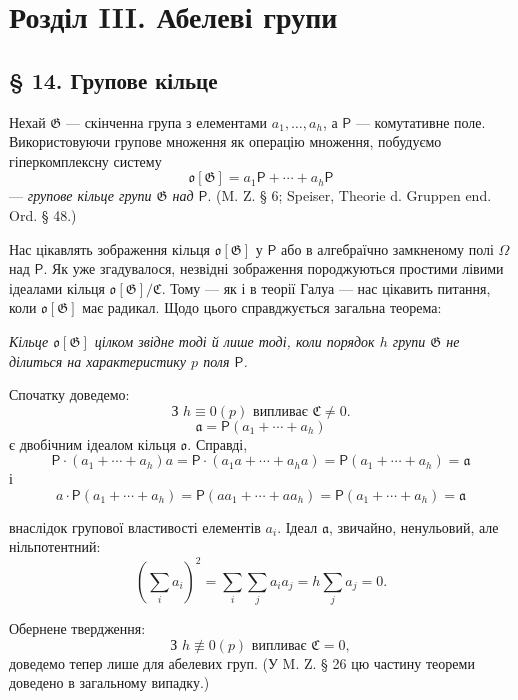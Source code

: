 \documentclass[11pt]{article}
\begin{document}
\section*{Розділ III. Абелеві групи}\label{kapitel-iii.-abelsche-gruppen}

\subsection*{§ 14. Групове кільце}\label{der-gruppenring}

Нехай \(\mathfrak G\) --- скінченна група з елементами \(a_1,\ldots,a_h\), а \(\mathsf P\) --- комутативне поле. Використовуючи групове множення як операцію множення, побудуємо гіперкомплексну систему
\[
\mathfrak o[\mathfrak G]=a_1\mathsf P+\cdots+a_h\mathsf P
\]
--- \emph{групове кільце групи \(\mathfrak G\) над \(\mathsf P\)}. (M. Z. § 6; Speiser, Theorie d. Gruppen end. Ord. § 48.)

Нас цікавлять зображення кільця \(\mathfrak o[\mathfrak G]\) у \(\mathsf P\) або в алгебраїчно замкненому полі \(\Omega\) над \(\mathsf P\). Як уже згадувалося, незвідні зображення породжуються простими лівими ідеалами кільця \(\mathfrak o[\mathfrak G]/\mathfrak C\). Тому --- як і в теорії Галуа --- нас цікавить питання, коли \(\mathfrak o[\mathfrak G]\) має радикал. Щодо цього справджується загальна теорема:

\begin{center}
\emph{Кільце \(\mathfrak o[\mathfrak G]\) цілком звідне тоді й лише тоді, коли порядок \(h\) групи \(\mathfrak G\) не ділиться на характеристику \(p\) поля \(\mathsf P\).}
\end{center}

Спочатку доведемо:
\[
\text{З } h\equiv0(p) \text{ випливає } \mathfrak C\ne 0.
\]
\[
\mathfrak a=\mathsf P(a_1+\cdots+a_h)
\]
є двобічним ідеалом кільця \(\mathfrak o\). Справді,
\[
\mathsf P\cdot(a_1+\cdots+a_h)a
=\mathsf P\cdot(a_1a+\cdots+a_ha)
=\mathsf P(a_1+\cdots+a_h)=\mathfrak a
\]
і
\[
a\cdot\mathsf P(a_1+\cdots+a_h)
=\mathsf P(aa_1+\cdots+aa_h)
=\mathsf P(a_1+\cdots+a_h)=\mathfrak a
\]

внаслідок групової властивості елементів \(a_i\). Ідеал \(\mathfrak a\), звичайно, ненульовий, але нільпотентний:
\[
\left(\sum_i a_i\right)^2=\sum_i\sum_j a_i a_j
=h\sum_j a_j=0.
\]

Обернене твердження:
\[
\text{З } h\not\equiv0(p) \text{ випливає } \mathfrak C=0,
\]
доведемо тепер лише для абелевих груп. (У M. Z. § 26 цю частину теореми доведено в загальному випадку.)
\end{document}
